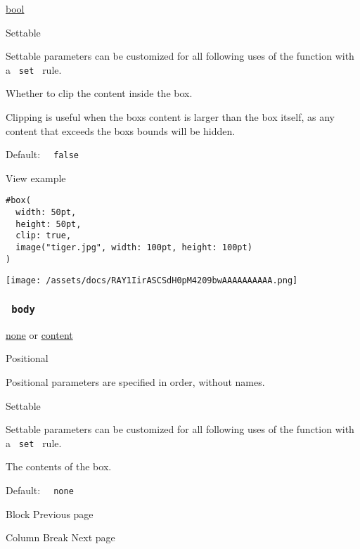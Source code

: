 \href{/docs/reference/foundations/bool/}{bool}

{{ Settable }}

\label{parameters-clip-settable-tooltip}
Settable parameters can be customized for all following uses of the
function with a \texttt{\ set\ } rule.

Whether to clip the content inside the box.

Clipping is useful when the box\textquotesingle s content is larger than
the box itself, as any content that exceeds the box\textquotesingle s
bounds will be hidden.

Default: \texttt{\ }{\texttt{\ false\ }}\texttt{\ }


View example

\begin{verbatim}
#box(
  width: 50pt,
  height: 50pt,
  clip: true,
  image("tiger.jpg", width: 100pt, height: 100pt)
)
\end{verbatim}

\texttt{[image: /assets/docs/RAY1IirASCSdH0pM4209bwAAAAAAAAAA.png]}

\subsubsection{\texorpdfstring{\texttt{\ body\ }}{ body }}\label{parameters-body}

\href{/docs/reference/foundations/none/}{none} {or}
\href{/docs/reference/foundations/content/}{content}

{{ Positional }}

\label{parameters-body-positional-tooltip}
Positional parameters are specified in order, without names.

{{ Settable }}

\label{parameters-body-settable-tooltip}
Settable parameters can be customized for all following uses of the
function with a \texttt{\ set\ } rule.

The contents of the box.

Default: \texttt{\ }{\texttt{\ none\ }}\texttt{\ }

\href{/docs/reference/layout/block/}{\pandocbounded{}}

{ Block } { Previous page }

\href{/docs/reference/layout/colbreak/}{\pandocbounded{}}

{ Column Break } { Next page }
